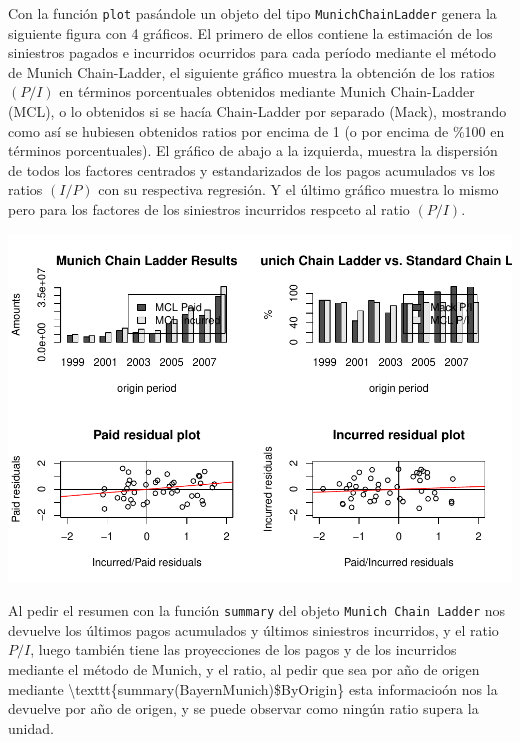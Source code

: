 \documentclass[
  12pt,
]{article}
\begin{document}
Con la función \texttt{plot} pasándole un objeto del tipo
\texttt{MunichChainLadder} genera la siguiente figura con 4 gráficos. El
primero de ellos contiene la estimación de los siniestros pagados e
incurridos ocurridos para cada período mediante el método de Munich
Chain-Ladder, el siguiente gráfico muestra la obtención de los ratios
\((P/I)\) en términos porcentuales obtenidos mediante Munich
Chain-Ladder (MCL), o lo obtenidos si se hacía Chain-Ladder por separado
(Mack), mostrando como así se hubiesen obtenidos ratios por encima de 1
(o por encima de \%100 en términos porcentuales). El gráfico de abajo a
la izquierda, muestra la dispersión de todos los factores centrados y
estandarizados de los pagos acumulados vs los ratios \((I/P)\) con su
respectiva regresión. Y el último gráfico muestra lo mismo pero para los
factores de los siniestros incurridos respceto al ratio \((P/I)\).

\includegraphics{informe_files/figure-latex/unnamed-chunk-29-1.pdf}

Al pedir el resumen con la función \texttt{summary} del objeto
\texttt{Munich Chain Ladder} nos devuelve los últimos pagos acumulados y
últimos siniestros incurridos, y el ratio \(P/I\), luego también tiene
las proyecciones de los pagos y de los incurridos mediante el método de
Munich, y el ratio, al pedir que sea por año de origen mediante
\textbackslash texttt\{summary(BayernMunich)\$ByOrigin\} esta
informacioón nos la devuelve por año de origen, y se puede observar como
ningún ratio supera la unidad.
\end{document}
